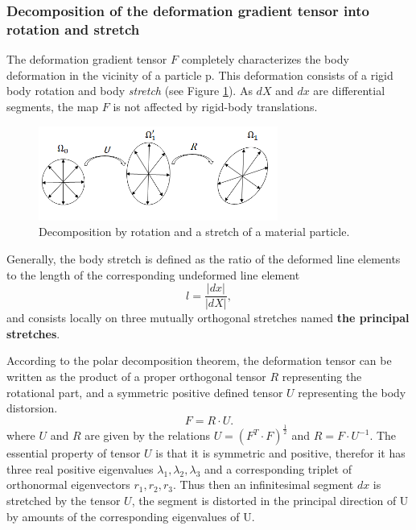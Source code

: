 \subsubsection*{Decomposition of the deformation gradient tensor into rotation and stretch}\label{deformationgradienttensor}
The deformation gradient tensor $F$ completely characterizes
the body deformation in the vicinity of a particle p. This deformation consists of a rigid body rotation and body \textit{stretch} (see Figure \ref{deformationGradientDecom}). As $dX$ and $dx$ are differential segments, the map $F$ is not affected by rigid-body translations.  

\begin{figure}
\begin{center}
\includegraphics[width=0.7\textwidth,keepaspectratio]{figures/deformationTensorDecomposition.png} 
\caption[]{Decomposition by rotation and a stretch of a material particle.  }
\label{deformationGradientDecom}
\end{center}
\end{figure}


Generally, the body stretch is defined as the ratio of the deformed line elements to the length of the corresponding undeformed line element 
\begin{equation}
l = \frac{\vert dx \vert}{\vert dX \vert},
\end{equation} 
and consists locally on three mutually orthogonal stretches named \textbf{the principal stretches}.

According to the polar decomposition theorem, the deformation tensor can be written as the product of a proper orthogonal tensor $R$ representing the rotational part, and a symmetric positive defined tensor $U$ representing the body distorsion. 
\begin{equation}
F = R \cdot U.
\end{equation}
where $U$ and $R$ are given by the relations $U = (F^T \cdot F)^ {\frac{1}{2}} $ and $R = F \cdot U^{-1}$. The essential property of tensor $U$ is that it is symmetric and positive, therefor it has three real positive eigenvalues
$\lambda_1, \lambda_2, \lambda_3$ and a corresponding triplet of orthonormal eigenvectors $r_1, r_2, r_3$. Thus then an infinitesimal segment $dx$ is stretched by the tensor $U$, the segment is distorted in the principal direction of U by amounts of the corresponding eigenvalues of U. 

